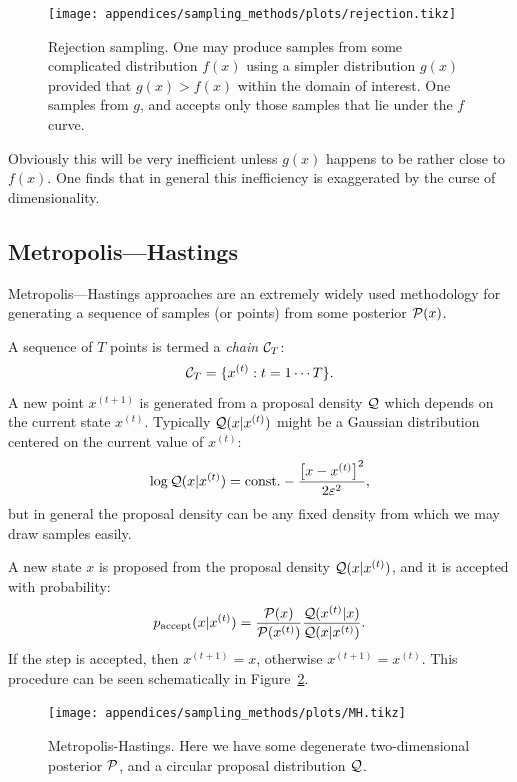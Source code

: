\begin{figure}[tp]
  \centering
  \texttt{[image: appendices/sampling\_methods/plots/rejection.tikz]}
  \caption{Rejection sampling. One may produce samples from some complicated distribution \(f(x)\) using a simpler distribution \(g(x)\) provided that \(g(x)>f(x)\) within the domain of interest. One samples from \(g\), and accepts only those samples that lie under the \(f\) curve.}\label{fig:sm:rej}
\end{figure}

Obviously this will be very inefficient unless \(g(x)\) happens to be rather close to \(f(x)\). One finds that in general this inefficiency is exaggerated by the curse of dimensionality.

\subsection{Metropolis---Hastings}
\label{sec:sm:mh}
Metropolis---Hastings approaches are an extremely widely used methodology for generating a sequence of samples (or points) from some posterior \(\mathcal{P}(x)\).

A sequence of \(T\) points is termed a {\em chain\/} \(\mathcal{C}_T\):
\begin{equation}
  \mathcal{C}_T = \{ x^{(t)}: t=1\cdots T \}.
\end{equation}
A new point \(x^{(t+1)}\) is generated from a proposal density \(\mathcal{Q}\) which depends on the current state \(x^{(t)}\). Typically \(\mathcal{Q}(x|x^{(t)})\) might be a Gaussian distribution centered on the current value of \(x^{(t)}\):
\begin{equation}
  \log \mathcal{Q}(x|x^{(t)}) = \text{const.} -\frac{{\left[ x-x^{(t)} \right]}^2}{2\varepsilon^2},
\end{equation}
but in general the proposal density can be any fixed density from which we may draw samples easily.

A new state \(x\) is proposed from the proposal density \(\mathcal{Q}(x|x^{(t)})\), and it is accepted with probability:
\begin{equation}
  p_\mathrm{accept}(x|x^{(t)}) = \frac{\mathcal{P}(x)}{\mathcal{P}(x^{(t)})}\frac{\mathcal{Q}(x^{(t)}|x)}{\mathcal{Q}(x|x^{(t)})}.
\end{equation}
If the step is accepted, then \(x^{(t+1)}=x\), otherwise \(x^{(t+1)} = x^{(t)}\). This procedure can be seen schematically in Figure~\ref{fig:sm:MH}.
\begin{figure}[tp]
  \centering
  \texttt{[image: appendices/sampling\_methods/plots/MH.tikz]}
  \caption{Metropolis-Hastings. Here we have some degenerate two-dimensional posterior \(\mathcal{P}\), and a circular proposal distribution \(\mathcal{Q}\).}\label{fig:sm:MH}
\end{figure}


